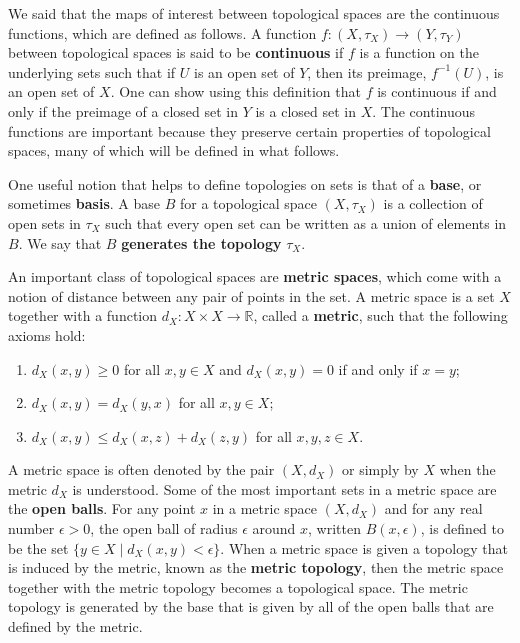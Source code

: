 \documentclass{article}
\theoremstyle{plain}
\theoremstyle{definition}
\theoremstyle{remark}
\begin{document}
We said that the maps of interest between topological spaces are the 
continuous functions, which are defined as follows.
A function $f : (X, \tau_X) \rightarrow (Y, \tau_Y)$ between topological spaces
is said to be \textbf{continuous} if $f$
is a function on the underlying sets such that if $U$ is an open set of $Y$,
then its preimage, $f^{-1}(U)$, is an open set of $X$.
One can show using this definition that $f$ is continuous if and only if
the preimage of a closed set in $Y$ is a closed set in $X$.
The continuous functions are important because they preserve certain properties 
of topological spaces, many of which will be defined in what follows.

One useful notion that helps to define topologies on sets is that of a \textbf{base},
or sometimes \textbf{basis}.
A base $B$ for a topological space $(X, \tau_X)$ is a collection of open sets in $\tau_X$
such that every open set can be written as a union of elements in $B$.
We say that $B$ \textbf{generates the topology} $\tau_X$.

An important class of topological spaces are \textbf{metric spaces}, 
which come with a notion of distance
between any pair of points in the set.
A metric space is a set $X$ together with a function 
$d_X: X \times X \rightarrow \mathbb{R}$, called a \textbf{metric},
such that the following axioms hold:
\begin{enumerate}
	\item $d_X(x,y) \geq 0$ for all $x, y \in X$ and $d_X(x,y) = 0$ if and only if $x = y$;
	\item $d_X(x,y) = d_X(y,x)$ for all $x, y \in X$;
	\item $d_X(x,y) \leq d_X(x,z) + d_X(z,y)$ for all $x, y, z \in X$.
\end{enumerate}
A metric space is often denoted by the pair $(X,d_X)$ or simply by $X$ when
the metric $d_X$ is understood.
Some of the most important sets in a metric space are the \textbf{open balls}.
For any point $x$ in a metric space $(X,d_X)$ and for any real number $\epsilon > 0$,
the open ball of radius $\epsilon$ around $x$, written $B(x, \epsilon)$,
is defined to be the set $\{y \in X \mid d_X(x,y) < \epsilon\}$.
When a metric space is given a topology that is induced by the metric,
known as the \textbf{metric topology},
then the metric space together with the metric topology becomes a topological space.
The metric topology is generated by the base 
that is given by all of the open balls that are defined by the metric.
\end{document}
